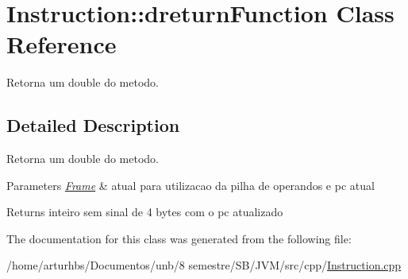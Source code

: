 \hypertarget{classInstruction_1_1dreturnFunction}{}\section{Instruction\+:\+:dreturn\+Function Class Reference}
\label{classInstruction_1_1dreturnFunction}


Retorna um double do metodo.  




\subsection{Detailed Description}
Retorna um double do metodo. 


\begin{DoxyParams}{Parameters}
{\em \hyperlink{classFrame}{Frame}} & atual para utilizacao da pilha de operandos e pc atual \\
\hline
\end{DoxyParams}
\begin{DoxyReturn}{Returns}
inteiro sem sinal de 4 bytes com o pc atualizado 
\end{DoxyReturn}


The documentation for this class was generated from the following file\+:\begin{DoxyCompactItemize}
\item 
/home/arturhbs/\+Documentos/unb/8 semestre/\+S\+B/\+J\+V\+M/src/cpp/\hyperlink{Instruction_8cpp}{Instruction.\+cpp}\end{DoxyCompactItemize}

